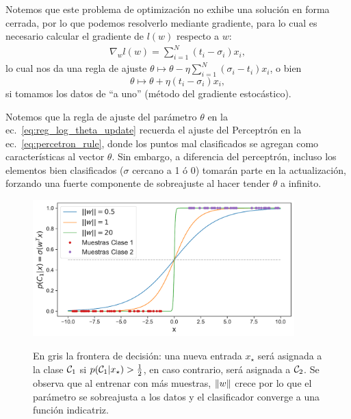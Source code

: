 Notemos que este  problema de optimización no exhibe una solución en forma cerrada, por lo que podemos resolverlo mediante gradiente, para lo cual es necesario calcular el gradiente de $l(w)$ respecto a $w$:
\begin{align}
\nabla_w l(w) = \sum_{i=1}^N (t_i-\sigma_i)x_i,
\end{align}
lo cual nos da una regla de  ajuste $\theta \mapsto \theta - \eta \sum_{i=1}^N (\sigma_i-t_i)x_i$, o bien 
\begin{equation}
	\theta \mapsto \theta + \eta(t_i-\sigma_i)x_i, \label{eq:reg_log_theta_update}
\end{equation}
si tomamos los  datos de ``a uno'' (método del gradiente estocástico).
\begin{remark}\label{rem:log_reg_shocks}
Notemos que la regla de ajuste del parámetro $\theta$ en la ec.~\eqref{eq:reg_log_theta_update} recuerda el ajuste del Perceptrón en la ec.~\eqref{eq:percetron_rule}, donde los puntos mal clasificados se agregan como características al vector $\theta$. Sin  embargo, a diferencia del  perceptrón, incluso los elementos bien clasificados ($\sigma$  cercano a  1 ó 0) tomarán parte en la actualización, forzando una fuerte componente de sobreajuste al hacer tender $\theta$ a infinito. 
\end{remark}

\begin{figure}[H]
	\centering
	\includegraphics[width=0.9\textwidth]{img/cap3_logistica.pdf}\\
	\caption{En gris la frontera de decisión: una nueva entrada $x_\star$ será asignada a la clase ${\mathcal C}_1$ si $p({\mathcal C}_1|x_\star)>\frac{1}{2}$, en caso contrario, será asignada a ${\mathcal C}_2$. Se observa que al entrenar con más muestras, $\left\lVert w\right\rVert$ crece por lo que el parámetro se sobreajusta a los datos y el clasificador converge a una función indicatriz.}
\end{figure}



